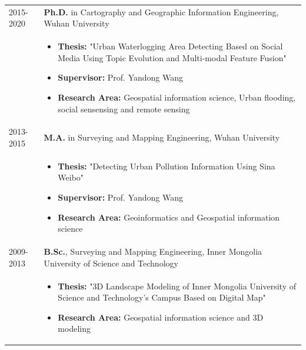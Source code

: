 \documentclass[11pt]{article}
\begin{document}
\begin{longtable}[l]{@{}p{} p{}}
	2015-2020 & \textbf{Ph.D.} in Cartography and Geographic Information Engineering, Wuhan University                                                \\
	          & \begin{itemize}
		            \item \textbf{Thesis:} "Urban Waterlogging Area Detecting Based on Social Media Using Topic Evolution and Multi-modal Feature Fusion"
		            \item \textbf{Supervisor:} Prof. Yandong Wang
		            \item \textbf{Research Area:} Geospatial information science, Urban flooding, social sensensing and remote sensing
	            \end{itemize} \\
	2013-2015 & \textbf{M.A.} in Surveying and Mapping Engineering, Wuhan University                                                                  \\
	          & \begin{itemize}
		            \item \textbf{Thesis:} "Detecting Urban Pollution Information Using Sina Weibo"
		            \item \textbf{Supervisor:} Prof. Yandong Wang
		            \item \textbf{Research Area:} Geoinformatics and Geospatial information science
	            \end{itemize}                                                       \\
	2009-2013 & \textbf{B.Sc.}, Surveying and Mapping Engineering, Inner Mongolia University of Science and Technology                                \\
	          & \begin{itemize}
		            \item \textbf{Thesis:} "3D Landscape Modeling of Inner Mongolia University of Science and Technology's Campus Based on Digital Map"
		            \item \textbf{Research Area:} Geospatial information science and 3D modeling
	            \end{itemize}
\end{longtable}

\renewcommand{\thefootnote}{\arabic{footnote}}
\setcounter{footnote}{1}
\end{document}
